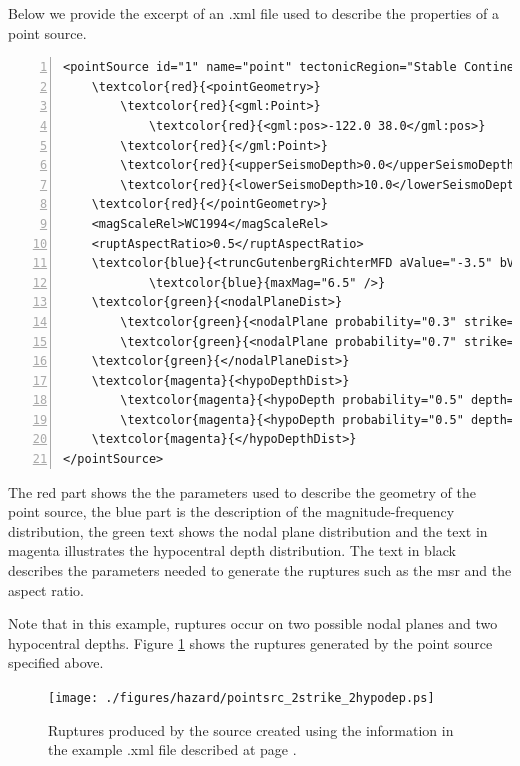 Below we provide the excerpt of an .xml file used to describe the 
properties of a point source. 
\label{page:xml_point}
\begin{Verbatim}[frame=single, commandchars=\\\{\}, fontsize=\footnotesize,
    numbers=left, numbersep=2pt]
<pointSource id="1" name="point" tectonicRegion="Stable Continental Crust">
    \textcolor{red}{<pointGeometry>}
        \textcolor{red}{<gml:Point>}
            \textcolor{red}{<gml:pos>-122.0 38.0</gml:pos>}
        \textcolor{red}{</gml:Point>}
        \textcolor{red}{<upperSeismoDepth>0.0</upperSeismoDepth>}
        \textcolor{red}{<lowerSeismoDepth>10.0</lowerSeismoDepth>}
    \textcolor{red}{</pointGeometry>}
    <magScaleRel>WC1994</magScaleRel>
    <ruptAspectRatio>0.5</ruptAspectRatio>
    \textcolor{blue}{<truncGutenbergRichterMFD aValue="-3.5" bValue="1.0" minMag="5.0" }
			\textcolor{blue}{maxMag="6.5" />}
    \textcolor{green}{<nodalPlaneDist>}
        \textcolor{green}{<nodalPlane probability="0.3" strike="0.0" dip="90.0" rake="0.0" />}
        \textcolor{green}{<nodalPlane probability="0.7" strike="90.0" dip="45.0" rake="90.0" />}
    \textcolor{green}{</nodalPlaneDist>}
    \textcolor{magenta}{<hypoDepthDist>}
        \textcolor{magenta}{<hypoDepth probability="0.5" depth="4.0" />}
        \textcolor{magenta}{<hypoDepth probability="0.5" depth="8.0" />}
    \textcolor{magenta}{</hypoDepthDist>}
</pointSource>
\end{Verbatim}
The red part shows the the parameters used to 
describe the geometry of the point source, the blue part is the description
of the magnitude-frequency distribution, the green text shows the nodal 
plane distribution and the text in magenta illustrates the hypocentral depth 
distribution.
%
The text in black describes the parameters needed to generate the ruptures 
such as the \gls{msr} and the aspect ratio.

Note that in this example, ruptures occur on two possible nodal planes 
and two hypocentral depths. Figure \ref{fig:point_source_ruptures} shows 
the ruptures generated by the point source specified above.

\begin{figure}[!ht]
\centering
\texttt{[image: ./figures/hazard/pointsrc\_2strike\_2hypodep.ps]}
\caption{Ruptures produced by the source created using the information 
    in the example .xml file described at page \pageref{page:xml_point}.}
\label{fig:point_source_ruptures}
\end{figure}
%
